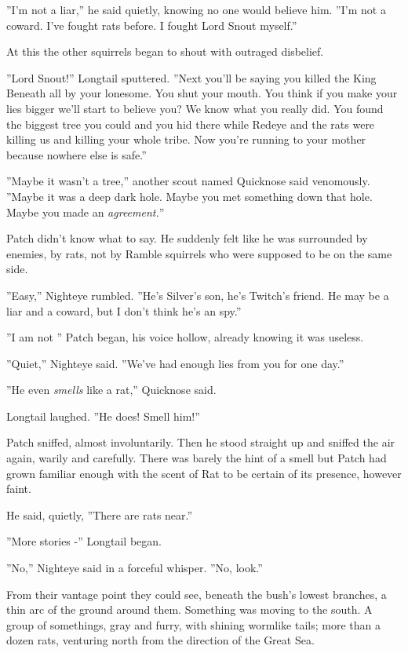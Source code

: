 \documentclass[11pt]{article}
\begin{document}
 ''I'm not a liar,'' he said quietly, knowing no one would believe him. ''I'm not a coward. I've fought rats before. I fought Lord Snout myself.''\par
 At this the other squirrels began to shout with outraged disbelief.\par
 ''Lord Snout!'' Longtail sputtered. ''Next you'll be saying you killed the King Beneath all by your lonesome. You shut your mouth. You think if you make your lies bigger we'll start to believe you? We know what you really did. You found the biggest tree you could and you hid there while Redeye and the rats were killing us and killing your whole tribe. Now you're running to your mother because nowhere else is safe.''\par
 ''Maybe it wasn't a tree,'' another scout named Quicknose said venomously. ''Maybe it was a deep dark hole. Maybe you met something down that hole. Maybe you made an {\it agreement.}''\par
 Patch didn't know what to say. He suddenly felt like he was surrounded by enemies, by rats, not by Ramble squirrels who were supposed to be on the same side.\par
 ''Easy,'' Nighteye rumbled. ''He's Silver's son, he's Twitch's friend. He may be a liar and a coward, but I don't think he's an spy.''\par
 ''I am not %
'' Patch began, his voice hollow, already knowing it was useless.\par
 ''Quiet,'' Nighteye said. ''We've had enough lies from you for one day.''\par
 ''He even {\it smells} like a rat,'' Quicknose said.\par
 Longtail laughed. ''He does! Smell him!''\par
 Patch sniffed, almost involuntarily. Then he stood straight up and sniffed the air again, warily and carefully. There was barely the hint of a smell %
 but Patch had grown familiar enough with the scent of Rat to be certain of its presence, however faint.\par
 He said, quietly, ''There are rats near.''\par
 ''More stories -'' Longtail began.\par
 ''No,'' Nighteye said in a forceful whisper. ''No, look.''\par
 From their vantage point they could see, beneath the bush's lowest branches, a thin arc of the ground around them. Something was moving to the south. A group of somethings, gray and furry, with shining wormlike tails; more than a dozen rats, venturing north from the direction of the Great Sea.\par
\end{document}
